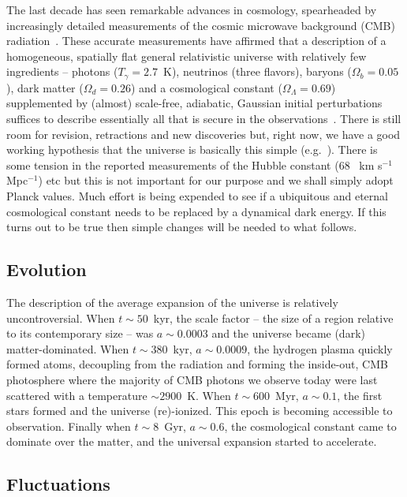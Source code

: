 \documentclass[psfig,11pt]{article}
\begin{document}
The last decade has seen remarkable advances in cosmology, spearheaded by increasingly detailed measurements of the cosmic microwave background (CMB) radiation~\cite{Planck2015maps, SPT?, ACT?}. These accurate measurements have affirmed that a description of a homogeneous, spatially flat general relativistic universe with relatively few ingredients -- photons ($T_\gamma=2.7$~K), neutrinos (three flavors), baryons ($\Omega_b=0.05$), dark matter ($\Omega_d=0.26$) and a cosmological constant ($\Omega_\Lambda=0.69$) supplemented by (almost) scale-free, adiabatic, Gaussian initial perturbations suffices to describe essentially all that is secure in the observations~\cite{Planck2015cosmopara}. There is still room for revision, retractions and new discoveries but, right now, we have a good working hypothesis that the universe is basically this simple (e.g.~\cite{Weinberg2008, Schneider2015}). There is some tension in the reported measurements of the Hubble constant (68 ~km s$^{-1}$ Mpc$^{-1}$) etc but this is not important for our purpose and we shall simply adopt Planck values. Much effort is being expended to see if a ubiquitous and eternal cosmological constant needs to be replaced by a dynamical dark energy. If this turns out to be true then simple changes will be needed to what follows.

\subsection{Evolution}

The description of the average expansion of the universe is relatively uncontroversial. When  $t\sim 50$~kyr,  the scale factor -- the size of a region relative to its contemporary size -- was $a\sim0.0003$ and the universe became (dark) matter-dominated. When $t\sim380$~kyr, $a\sim0.0009$, the hydrogen plasma quickly formed atoms, decoupling from the radiation and forming the inside-out, CMB photosphere where the majority of CMB photons we observe today were last scattered with a temperature $\sim2900$~K. When $t\sim600$~Myr, $a\sim0.1$, the first stars formed and the universe (re)-ionized. This epoch is becoming accessible to observation. Finally when $t\sim8$~Gyr, $a\sim0.6$, the cosmological constant came to dominate over the matter, and the universal expansion started to accelerate.

\subsection{Fluctuations}
\end{document}
